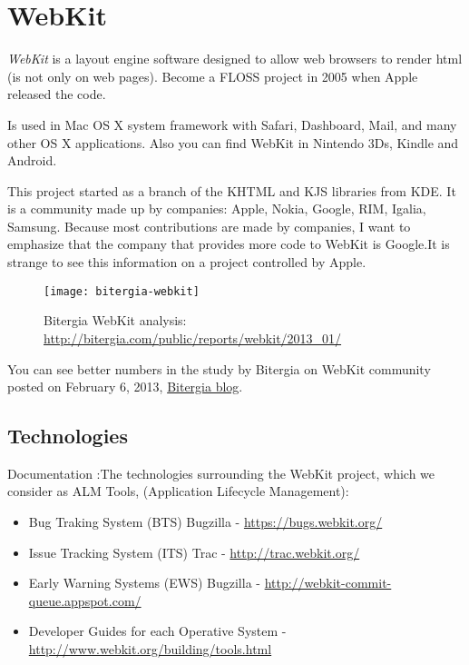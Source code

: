 \section{WebKit}
\label{sec:webkit}

\par \emph{WebKit} is a layout engine software designed to allow web browsers to render html (is not only on web pages). Become a FLOSS project in 2005 when Apple released the code.

\par Is used in Mac OS X system framework with Safari, Dashboard, Mail, and many other OS X applications. Also you can find WebKit in Nintendo 3Ds, Kindle and Android.

\par This project started as a branch of the KHTML and KJS libraries from KDE. It is a community made ​​up by companies: Apple, Nokia, Google, RIM, Igalia, Samsung. Because most contributions are made by companies, I want to emphasize that the company that provides more code to WebKit is Google.It is strange to see this information on a project controlled by Apple.

\begin{figure}[H]
    \centering
    \texttt{[image: bitergia-webkit]}
    \caption{Bitergia WebKit analysis: \url{http://bitergia.com/public/reports/webkit/2013_01/}}
    \label{}
\end{figure}

\par You can see better numbers in the study by Bitergia on WebKit community posted on February 6, 2013, \href{http://blog.bitergia.com/2013/02/06/report-on-the-activity-of-companies-in-the-webkit-project/}{Bitergia blog}.

\subsection{Technologies}

\par Documentation :The technologies surrounding the WebKit project, which we consider as ALM Tools, (Application Lifecycle Management):

\begin{itemize}
	\item Bug Traking System (BTS) Bugzilla - \url{https://bugs.webkit.org/}
	\item Issue Tracking System (ITS) Trac - \url{http://trac.webkit.org/}
	\item Early Warning Systems (EWS) Bugzilla - \url{http://webkit-commit-queue.appspot.com/}
	\item Developer Guides for each Operative System - \url{http://www.webkit.org/building/tools.html}
\end{itemize}

